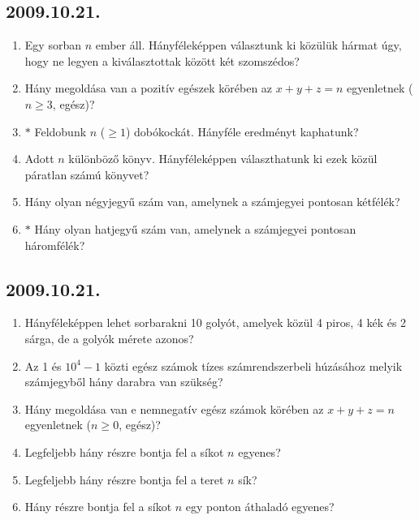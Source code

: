 \subsection*{2009.10.21.}
\begin{enumerate}
\item Egy sorban $n$ ember áll. Hányféleképpen választunk ki közülük hármat úgy, hogy ne legyen a kiválasztottak között két szomszédos?
\item Hány megoldása van a pozitív egészek körében az $x+y+z=n$ egyenletnek ($n\geq 3$, egész)?
\item $*$ Feldobunk $n$ ($\geq 1$) dobókockát. Hányféle eredményt kaphatunk?
\item Adott $n$ különböző könyv. Hányféleképpen választhatunk ki ezek közül páratlan számú könyvet?
\item Hány olyan négyjegyű szám van, amelynek a számjegyei pontosan kétfélék?
\item $*$ Hány olyan hatjegyű szám van, amelynek a számjegyei pontosan háromfélék?
\end{enumerate}

\subsection*{2009.10.21.}
\begin{enumerate}
\item Hányféleképpen lehet sorbarakni 10 golyót, amelyek közül 4 piros, 4 kék és 2 sárga, de a golyók mérete azonos?
\item Az 1 és $10^4-1$ közti egész számok tízes számrendszerbeli húzásához melyik számjegyből hány darabra van szükség?
\item Hány megoldása van e nemnegatív egész számok körében az $x+y+z=n$ egyenletnek ($n\geq 0$, egész)?
\item Legfeljebb hány részre bontja fel a síkot $n$ egyenes?
\item Legfeljebb hány részre bontja fel a teret $n$ sík?
\item Hány részre bontja fel a síkot $n$ egy ponton áthaladó egyenes?
\end{enumerate}

